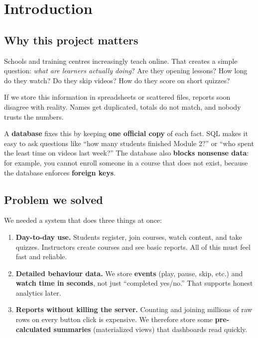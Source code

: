 
\chapter{Introduction}
\label{ch:intro}

\section{Why this project matters}
Schools and training centres increasingly teach online. That creates a simple question: \textit{what are learners actually doing}? Are they opening lessons? How long do they watch? Do they skip videos? How do they score on short quizzes?

If we store this information in spreadsheets or scattered files, reports soon disagree with reality. Names get duplicated, totals do not match, and nobody trusts the numbers.

A \textbf{database} fixes this by keeping \textbf{one official copy} of each fact. SQL makes it easy to ask questions like ``how many students finished Module 2?'' or ``who spent the least time on videos last week?'' The database also \textbf{blocks nonsense data}: for example, you cannot enroll someone in a course that does not exist, because the database enforces \textbf{foreign keys}.

\section{Problem we solved}
We needed a system that does three things at once:

\begin{enumerate}[label=(\alph*),leftmargin=*]
  \item \textbf{Day-to-day use.} Students register, join courses, watch content, and take quizzes. Instructors create courses and see basic reports. All of this must feel fast and reliable.
  \item \textbf{Detailed behaviour data.} We store \textbf{events} (play, pause, skip, etc.) and \textbf{watch time in seconds}, not just ``completed yes/no.'' That supports honest analytics later.
  \item \textbf{Reports without killing the server.} Counting and joining millions of raw rows on every button click is expensive. We therefore store some \textbf{pre-calculated summaries} (materialized views) that dashboards read quickly.
\end{enumerate}

